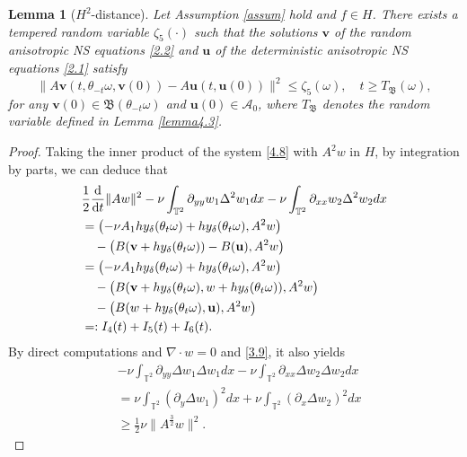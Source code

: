 \documentclass{elsarticle}
\newtheorem{lemma}[theorem]{Lemma}
\theoremstyle{definition}
\numberwithin{equation}{section}
\renewcommand{\d}{{\rm{d}}}
\begin{document}
\begin{lemma}[$H^2$-distance] \label{lem:H2bd}  Let Assumption \ref{assum} hold and $f\in H$.
There exists a tempered random variable $\zeta_5(\cdot)$ such that the solutions $\textbf{v}$ of the random anisotropic NS equations \eqref{2.2} and $\textbf{u}$  of the deterministic anisotropic NS equations  \eqref{2.1} satisfy
\[
 \|A\textbf{v}(t,\theta_{-t}\omega,\textbf{v}(0))-A\textbf{u}(t,\textbf{u}(0))\|^2\leq \zeta_5(\omega),
\quad t\geq T_{\mathfrak B}(\omega),
\]
for any $\textbf{v}(0)\in\mathfrak{B}(\theta_{-t}\omega)$
 and $\textbf{u}(0)\in\mathcal{A}_0$,
where $T_{\mathfrak B}$ denotes the random variable defined in  Lemma \ref{lemma4.3}.
\end{lemma}
\begin{proof}

Taking the inner product of the system   \eqref{4.8} with $A^2w$ in $H$,  by integration by parts, we can deduce that
\begin{align}\label{4.17}
 &\frac12\frac{\d}{\d t}\|Aw\|^2- \nu \int_{\mathbb{T}^2}\partial_{yy}w_1\Delta^2 w_1dx-\nu \int_{\mathbb{T}^2}\partial_{xx}w_2\Delta^2 w_2dx\nonumber \\
&= \left(-\nu A_1hy_\delta(\theta_t\omega) +hy_\delta(\theta_t\omega),A^2w \right) \nonumber \\
&\quad -\left(B(\textbf{v}+hy_\delta(\theta_t\omega)) -B(\textbf{u}),A^2w \right)\nonumber\\
&=  \left(-\nu A_1hy_\delta(\theta_t\omega) +hy_\delta(\theta_t\omega),A^2w \right)\nonumber\\
&\quad -\left(B(\textbf{v}+hy_\delta(\theta_t\omega),w+hy_\delta(\theta_t\omega)),A^2w \right )\nonumber\\
&\quad
-\left(B(w+hy_\delta(\theta_t\omega),\textbf{u}),A^2w \right )\nonumber\\
&=: I_{4}(t)+I_{5}(t)+I_{6}(t).
\end{align}
By direct computations and $\nabla\cdot w=0$ and \eqref{3.9}, it also yields
\begin{align}
&-\nu \int_{\mathbb{T}^2}\partial_{yy}\Delta w_1\Delta w_1dx-\nu \int_{\mathbb{T}^2}\partial_{xx}\Delta w_2\Delta w_2dx\nonumber\\
&= \nu \int_{\mathbb{T}^2}(\partial_{y}\Delta w_1)^2dx
+\nu \int_{\mathbb{T}^2}(\partial_{x}\Delta w_2)^2dx
\nonumber\\
&\geq\frac12\nu\|A^{\frac32} w\|^2.
\end{align}


\end{proof}
\end{document}
